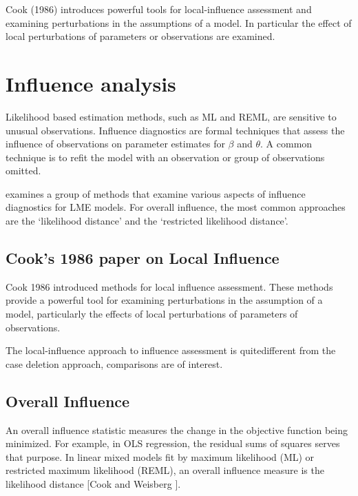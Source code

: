 \documentclass[Chap5amain.tex]{subfiles}
\begin{document}
Cook (1986) introduces powerful tools for local-influence assessment and examining perturbations in the assumptions of a model. In particular the effect of local perturbations of parameters or observations are examined.

\newpage
\section{Influence analysis} %


Likelihood based estimation methods, such as ML and REML, are sensitive to unusual observations. Influence diagnostics are formal techniques that assess the influence of observations on parameter estimates for $\beta$ and $\theta$. A common technique is to refit the model with an observation or group of observations omitted.


\citet{west} examines a group of methods that examine various aspects of influence diagnostics for LME models.
For overall influence, the most common approaches are the `likelihood distance' and the `restricted likelihood distance'.


\subsection{Cook's 1986 paper on Local Influence}%
Cook 1986 introduced methods for local influence assessment. These methods provide a powerful tool for examining perturbations in the assumption of a model, particularly the effects of local perturbations of parameters of observations.


The local-influence approach to influence assessment is quitedifferent from the case deletion approach, comparisons are of
interest.






\subsection{Overall Influence}
An overall influence statistic measures the change in the objective function being minimized. For example, in
OLS regression, the residual sums of squares serves that purpose. In linear mixed models fit by
 maximum likelihood (ML) or  restricted maximum likelihood (REML), an overall influence measure is the  likelihood distance [Cook and Weisberg ].
\end{document}
